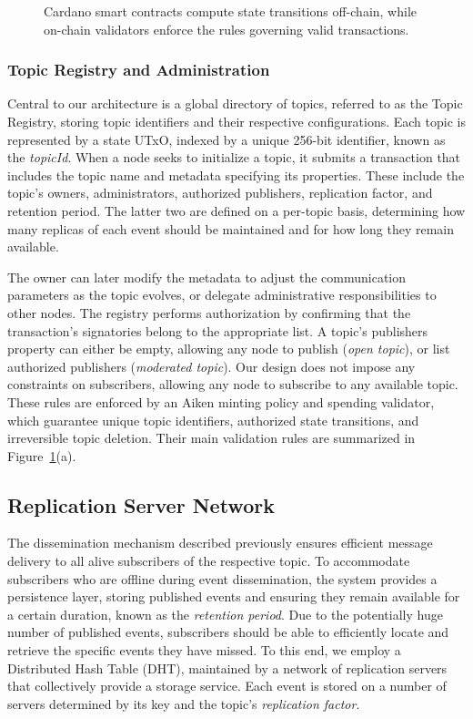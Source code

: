 \begin{figure}[!t]
    \caption{Cardano smart contracts compute state transitions off-chain, while on-chain validators enforce the rules governing valid transactions.}
    \label{fig:registry-validators}
\end{figure}

\subsubsection{Topic Registry and Administration}

Central to our architecture is a global directory of topics, referred to as the Topic Registry, storing topic identifiers and their respective configurations.
Each topic is represented by a state UTxO, indexed by a unique 256-bit identifier, known as the \emph{topicId}.
When a node seeks to initialize a topic, it submits a transaction that includes the topic name and metadata specifying its properties.
These include the topic's owners, administrators, authorized publishers, replication factor, and retention period.
The latter two are defined on a per-topic basis, determining how many replicas of each event should be maintained and for how long they remain available.

The owner can later modify the metadata to adjust the communication parameters as the topic evolves, or delegate administrative responsibilities to other nodes.
The registry performs authorization by confirming that the transaction's signatories belong to the appropriate list.
A topic's publishers property can either be empty, allowing any node to publish (\emph{open topic}), or list authorized publishers (\emph{moderated topic}).
Our design does not impose any constraints on subscribers, allowing any node to subscribe to any available topic.
These rules are enforced by an Aiken minting policy and spending validator, which guarantee unique topic identifiers, authorized state transitions, and irreversible topic deletion.
Their main validation rules are summarized in Figure~\ref{fig:registry-validators}(a).


\subsection{Replication Server Network}
\label{subsec:replication-server-network}

The dissemination mechanism described previously ensures efficient message delivery to all alive subscribers of the respective topic.
To accommodate subscribers who are offline during event dissemination, the system provides a persistence layer, storing published events and ensuring they remain available for a certain duration, known as the \emph{retention period}. 
Due to the potentially huge number of published events, subscribers should be able to efficiently locate and retrieve the specific events they have missed.
To this end, we employ a Distributed Hash Table (DHT), maintained by a network of replication servers that collectively provide a storage service.
Each event is stored on a number of servers determined by its key and the topic's \emph{replication factor}.

